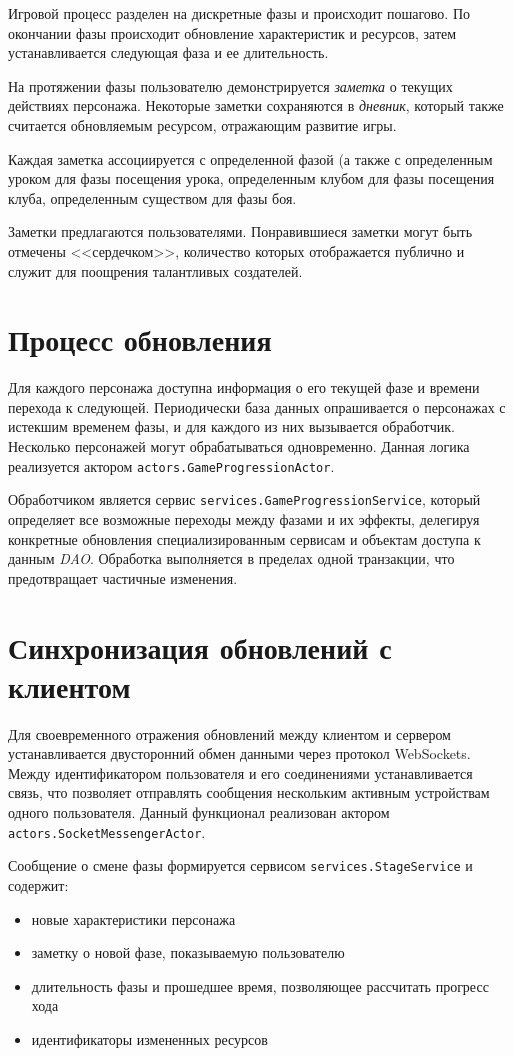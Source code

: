 \documentclass[12pt, a4paper]{article}
\begin{document}
Игровой процесс разделен на дискретные фазы и происходит пошагово. По окончании фазы
происходит обновление характеристик и ресурсов, затем устанавливается следующая фаза
и ее длительность.

На протяжении фазы пользователю демонстрируется \textit{заметка} о текущих действиях
персонажа. Некоторые заметки сохраняются в \textit{дневник}, который также считается
обновляемым ресурсом, отражающим развитие игры.

Каждая заметка ассоциируется с определенной фазой (а также с определенным уроком
для фазы посещения урока, определенным клубом для фазы посещения клуба,
определенным существом для фазы боя.

Заметки предлагаются пользователями. Понравившиеся заметки могут быть отмечены
<<сердечком>>, количество которых отображается публично и служит для поощрения
талантливых создателей.

\section*{Процесс обновления}

Для каждого персонажа доступна информация о его текущей фазе и времени перехода к
следующей. Периодически база данных опрашивается о персонажах с истекшим
временем фазы, и для каждого из них вызывается обработчик. Несколько персонажей
могут обрабатываться одновременно. Данная логика реализуется актором
\texttt{actors.GameProgressionActor}.

Обработчиком является сервис \texttt{services.GameProgressionService},
который определяет все возможные переходы между фазами и их эффекты, делегируя
конкретные обновления специализированным сервисам и объектам доступа к данным \textit{DAO}.
Обработка выполняется в пределах одной транзакции, что предотвращает
частичные изменения.

\section*{Синхронизация обновлений с клиентом}

Для своевременного отражения обновлений между клиентом и сервером устанавливается
двусторонний обмен данными через протокол WebSockets. Между идентификатором пользователя
и его соединениями устанавливается связь, что позволяет отправлять сообщения нескольким активным
устройствам одного пользователя. Данный функционал реализован актором \texttt{actors.SocketMessengerActor}.

Сообщение о смене фазы формируется сервисом \texttt{services.StageService} и содержит:
\begin{itemize}[noitemsep, topsep=0pt]
\item новые характеристики персонажа
\item заметку о новой фазе, показываемую пользователю
\item длительность фазы и прошедшее время, позволяющее рассчитать прогресс хода
\item идентификаторы измененных ресурсов
\end{itemize}
\end{document}

